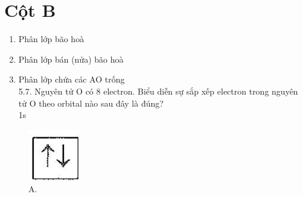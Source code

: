 \documentclass[10pt]{article}
\begin{document}
\section*{Cột B}
\begin{enumerate}
  \item Phân lớp bão hoà
  \item Phân lớp bán (nửa) bão hoà
  \item Phân lớp chứa các AO trống\\
5.7. Nguyên tử O có 8 electron. Biểu diễn sự sắp xếp electron trong nguyên tử O theo orbital nào sau đây là đúng?\\
1s
\end{enumerate}

\begin{figure}[h]
\begin{center}
\captionsetup{labelformat=empty}
\caption{A.}
  \includegraphics[width=\textwidth]{2025_10_23_76620c17ffac1ae9b35bg-12}
\end{center}
\end{figure}
\end{document}
